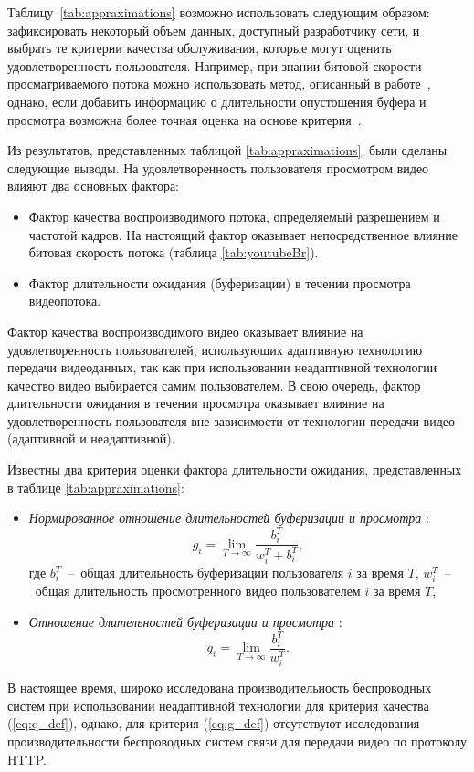 Таблицу~\ref{tab:appraximations} возможно использовать следующим образом: зафиксировать некоторый объем данных, доступный разработчику сети, и выбрать те критерии качества обслуживания, которые могут оценить удовлетворенность пользователя. Например, при знании битовой скорости просматриваемого потока можно использовать метод, описанный в работе~\cite{Suai2015}, однако, если добавить информацию о длительности опустошения буфера и просмотра возможна более точная оценка на основе критерия~\cite{Essaili_Rate}.

Из результатов, представленных таблицой \ref{tab:appraximations}, были сделаны следующие выводы. На удовлетворенность пользователя просмотром видео влияют два основных фактора:
\begin{itemize}
	\item Фактор качества воспроизводимого потока, определяемый разрешением и частотой кадров. На настоящий фактор оказывает непосредственное влияние битовая скорость потока (таблица \ref{tab:youtubeBr}).
	\item Фактор длительности ожидания (буферизации) в течении просмотра видеопотока.
\end{itemize}
Фактор качества воспроизводимого видео оказывает влияние на удовлетворенность пользователей, использующих адаптивную технологию передачи видеоданных, так как при использовании неадаптивной технологии качество видео выбирается самим пользователем. В свою очередь, фактор длительности ожидания в течении просмотра оказывает влияние на удовлетворенность пользователя вне зависимости от технологии передачи видео (адаптивной и неадаптивной).

Известны два критерия оценки фактора длительности ожидания, представленных в таблице \ref{tab:appraximations}:
\begin{itemize}
	\item \textit{Нормированное отношение длительностей буферизации и просмотра} \cite{QoE_Ozgur,past_tur}:
	\begin{equation}
    	\label{eq:g_def}
    	g_i = \lim\limits_{T\rightarrow\infty} \frac{b_i^T}{w_i^T + b_i^T},
    \end{equation}
    где $b_i^T$~--~общая длительность буферизации пользователя $i$ за время $T$, $w_i^T$~--~общая длительность просмотренного видео пользователем $i$ за время $T$,
	\item \textit{Отношение длительностей буферизации и просмотра} \cite{Bakin_Globecom}:
	\begin{equation}
    	\label{eq:q_def}
    	q_i = \lim\limits_{T\rightarrow\infty} \frac{b_i^T}{w_i^T}.
    \end{equation}
\end{itemize}
В настоящее время, широко исследована производительность беспроводных систем при использовании неадаптивной технологии для критерия качества (\ref{eq:q_def}), однако, для критерия (\ref{eq:g_def}) отсутствуют исследования производительности беспроводных систем связи для передачи видео по протоколу HTTP.


